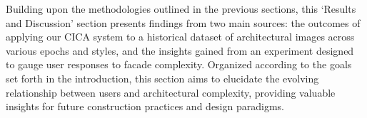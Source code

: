 %



Building upon the methodologies outlined in the previous sections, this `Results and Discussion' section presents findings from two main sources: the outcomes of applying our CICA system to a historical dataset of architectural images across various epochs and styles, and the insights gained from an experiment designed to gauge user responses to facade complexity.
Organized according to the goals set forth in the introduction, this section aims to elucidate the evolving relationship between users and architectural complexity, providing valuable insights for future construction practices and design paradigms.






